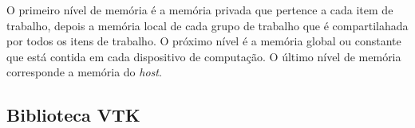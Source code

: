   O primeiro nível de memória é a memória privada que pertence a cada item de trabalho, depois a memória local de cada grupo de trabalho que é compartilahada por todos os itens de trabalho. O próximo nível é a memória global ou constante que está contida em cada dispositivo de computação. O último nível de memória corresponde a memória do \textit{host}.


  
  \subsection{Biblioteca VTK}
